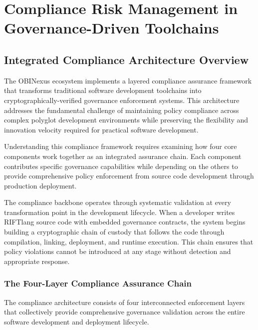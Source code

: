 \chapter{Compliance Risk Management in Governance-Driven Toolchains}
\label{ch:compliance-risk}

\section{Integrated Compliance Architecture Overview}

The OBINexus ecosystem implements a layered compliance assurance framework that transforms traditional software development toolchains into cryptographically-verified governance enforcement systems. This architecture addresses the fundamental challenge of maintaining policy compliance across complex polyglot development environments while preserving the flexibility and innovation velocity required for practical software development.

Understanding this compliance framework requires examining how four core components work together as an integrated assurance chain. Each component contributes specific governance capabilities while depending on the others to provide comprehensive policy enforcement from source code development through production deployment.

The compliance backbone operates through systematic validation at every transformation point in the development lifecycle. When a developer writes RIFTlang source code with embedded governance contracts, the system begins building a cryptographic chain of custody that follows the code through compilation, linking, deployment, and runtime execution. This chain ensures that policy violations cannot be introduced at any stage without detection and appropriate response.

\subsection{The Four-Layer Compliance Assurance Chain}

The compliance architecture consists of four interconnected enforcement layers that collectively provide comprehensive governance validation across the entire software development and deployment lifecycle.


